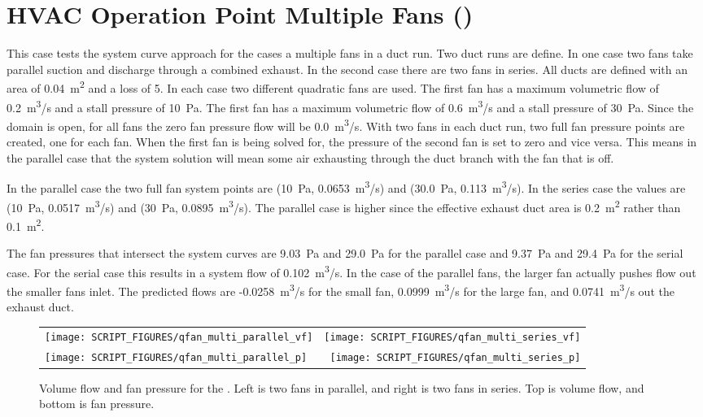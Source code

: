\documentclass[11pt]{book}
\begin{document}
\section{HVAC Operation Point Multiple Fans (\texorpdfstring{}{qfan\_multi})}
\label{qfan_multi}

This case tests the system curve approach for the cases a multiple fans in a duct run. Two duct runs are define. In one case two fans take parallel suction and discharge through a combined exhaust. In the second case there are two fans in series. All ducts are defined with an area of 0.04~\si{m^2} and a loss of 5. In each case two different quadratic fans are used. The first fan has a maximum volumetric flow of 0.2~\si{m^3/s} and a stall pressure of 10~Pa. The first fan has a maximum volumetric flow of 0.6~\si{m^3/s} and a stall pressure of 30~Pa. Since the domain is open, for all fans the zero fan pressure flow will be 0.0~\si{m^3/s}. With two fans in each duct run, two full fan pressure points are created, one for each fan. When the first fan is being solved for, the pressure of the second fan is set to zero and vice versa. This means in the parallel case that the system solution will mean some air exhausting through the duct branch with the fan that is off.

In the parallel case the two full fan system points are (10~Pa, 0.0653~\si{m^3/s}) and (30.0~Pa, 0.113~\si{m^3/s}). In the series case the values are (10~Pa, 0.0517~\si{m^3/s}) and (30~Pa, 0.0895~\si{m^3/s}). The parallel case is higher since the effective exhaust duct area is 0.2~\si{m^2} rather than 0.1~\si{m^2}.

The fan pressures that intersect the system curves are 9.03~Pa and 29.0~Pa for the parallel case and 9.37~Pa and 29.4~Pa for the serial case. For the serial case this results in a system flow of 0.102~\si{m^3/s}. In the case of the parallel fans, the larger fan actually pushes flow out the smaller fans inlet. The predicted flows are -0.0258~\si{m^3/s} for the small fan, 0.0999~\si{m^3/s} for the large fan, and 0.0741~\si{m^3/s} out the exhaust duct.

\begin{figure}[ht]
    \begin{tabular*}{\textwidth}{lr}
        \texttt{[image: SCRIPT\_FIGURES/qfan\_multi\_parallel\_vf]} &
        \texttt{[image: SCRIPT\_FIGURES/qfan\_multi\_series\_vf]} \\
        \texttt{[image: SCRIPT\_FIGURES/qfan\_multi\_parallel\_p]} &
        \texttt{[image: SCRIPT\_FIGURES/qfan\_multi\_series\_p]}
    \end{tabular*}
    \caption[Results of the  case]{Volume flow and fan pressure for the . Left is two fans in parallel, and right is two fans in series. Top is volume flow, and bottom is fan pressure.}
    \label{qfan_multi_fig}
\end{figure}
\end{document}
